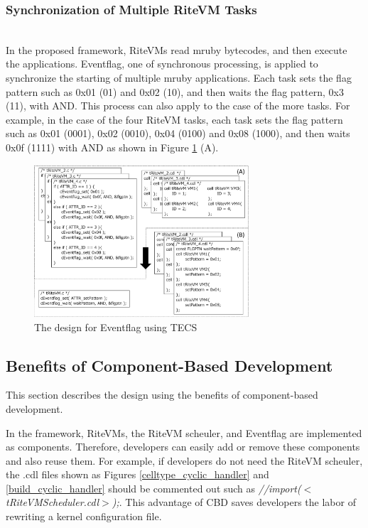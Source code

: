 \documentclass[conference,compsoc]{IEEEtran}
\begin{document}
\subsubsection{Synchronization of Multiple RiteVM Tasks} \mbox{}\\

In the proposed framework, RiteVMs read mruby bytecodes, and then execute the applications.
Eventflag, one of synchronous processing, is applied to synchronize the starting of multiple mruby applications.
Each task sets the flag pattern such as 0x01 (01) and 0x02 (10), and then waits the flag pattern, 0x3 (11), with AND.
This process can also apply to the case of the more tasks.
For example, in the case of the four RiteVM tasks, each task sets the flag pattern such as 0x01 (0001), 0x02 (0010), 0x04 (0100)  and 0x08 (1000), and then waits 0x0f (1111) with AND as shown in Figure \ref{fig:Eventflag} (A).

\begin{figure}[t]
    \centering
    \includegraphics[width=8cm,clip]{figure/Eventflag.pdf}
    \caption{The design for Eventflag using TECS}
    \label{fig:Eventflag}
\end{figure}
 
\subsection{Benefits of Component-Based Development}
This section describes the design using the benefits of component-based development.

In the framework, RiteVMs, the RiteVM scheuler, and Eventflag are implemented as components.
Therefore, developers can easily add or remove these components and also reuse them.
For example, if developers do not need the RiteVM scheuler, the .cdl files shown as Figures \ref{celltype_cyclic_handler} and \ref{build_cyclic_handler} should be commented out such as {\it //import($<$tRiteVMScheduler.cdl$>$);}.
This advantage of CBD saves developers the labor of rewriting a kernel configuration file.
\end{document}
